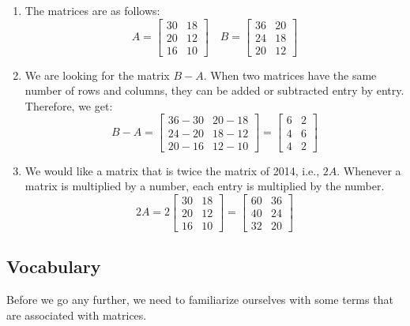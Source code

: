 \begin{solution}
    \begin{enumerate}

        \item The matrices are as follows:
              \[ A = \begin{bmatrix} 30 & 18 \\ 20 & 12 \\ 16 & 10 \end{bmatrix} \quad
                  B = \begin{bmatrix} 36 & 20 \\ 24 & 18 \\ 20 & 12 \end{bmatrix} \]

        \item We are looking for the matrix \( B - A \). When two matrices have the same number of rows and columns, they can be added or subtracted entry by entry. Therefore, we get:
              \[ B - A = \begin{bmatrix} 36 - 30 & 20 - 18 \\ 24 - 20 & 18 - 12 \\ 20 - 16 & 12 - 10 \end{bmatrix} = \begin{bmatrix} 6 & 2 \\ 4 & 6 \\ 4 & 2 \end{bmatrix} \]

        \item We would like a matrix that is twice the matrix of 2014, i.e., \( 2A \). Whenever a matrix is multiplied by a number, each entry is multiplied by the number.
              \[ 2A = 2 \begin{bmatrix} 30 & 18 \\ 20 & 12 \\ 16 & 10 \end{bmatrix} = \begin{bmatrix} 60 & 36 \\ 40 & 24 \\ 32 & 20 \end{bmatrix} \]
    \end{enumerate}
\end{solution}

\subsection{Vocabulary}

Before we go any further, we need to familiarize ourselves with some terms that are associated with matrices.

